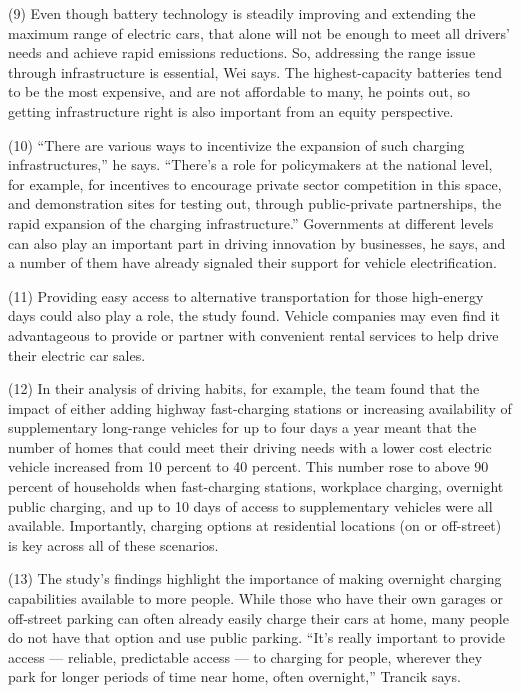 \documentclass[UTF8,11pt]{ctexart}
\begin{document}
(9) Even though battery technology is steadily improving and extending the maximum range of electric cars, that alone will not be enough to meet all drivers’ needs and achieve rapid emissions reductions. So, addressing the range issue through infrastructure is essential, Wei says. The highest-capacity batteries tend to be the most expensive, and are not affordable to many, he points out, so getting infrastructure right is also important from an equity perspective.


(10) “There are various ways to incentivize the expansion of such charging infrastructures,” he says. “There’s a role for policymakers at the national level, for example, for incentives to encourage private sector competition in this space, and demonstration sites for testing out, through public-private partnerships, the rapid expansion of the charging infrastructure.” Governments at different levels can also play an important part in driving innovation by businesses, he says, and a number of them have already signaled their support for vehicle electrification.


(11) Providing easy access to alternative transportation for those high-energy days could also play a role, the study found. Vehicle companies may even find it advantageous to provide or partner with convenient rental services to help drive their electric car sales.


(12) In their analysis of driving habits, for example, the team found that the impact of either adding highway fast-charging stations or increasing availability of supplementary long-range vehicles for up to four days a year meant that the number of homes that could meet their driving needs with a lower cost electric vehicle increased from 10 percent to 40 percent. This number rose to above 90 percent of households when fast-charging stations, workplace charging, overnight public charging, and up to 10 days of access to supplementary vehicles were all available. Importantly, charging options at residential locations (on or off-street) is key across all of these scenarios.


(13) The study’s findings highlight the importance of making overnight charging capabilities available to more people. While those who have their own garages or off-street parking can often already easily charge their cars at home, many people do not have that option and use public parking. “It’s really important to provide access — reliable, predictable access — to charging for people, wherever they park for longer periods of time near home, often overnight,” Trancik says.
\end{document}
